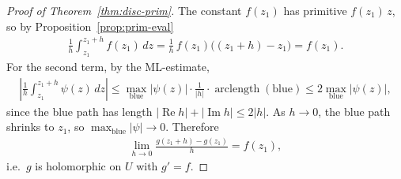 \documentclass[11pt]{article}
\theoremstyle{plain}
\theoremstyle{definition}
\theoremstyle{remark}
\numberwithin{equation}{section}
\newcommand{\be}{\begin{eqnarray}}
\newcommand{\ee}{\end{eqnarray}}
\DeclareMathOperator{\Real}{Re}
\DeclareMathOperator{\Imag}{Im}
\begin{document}
\begin{proof}[Proof of Theorem~\ref{thm:disc-prim}]
The constant $f(z_1)$ has primitive $f(z_1)\,z$, so by
Proposition~\ref{prop:prim-eval}
\be
 \frac1h\int_{z_1}^{z_1+h}f(z_1)\,dz=\frac1h\,f(z_1)\bigl((z_1+h)-z_1\bigr)=f(z_1).
\ee
For the second term, by the ML-estimate,
\be
 \left|\frac1h\int_{z_1}^{z_1+h}\psi(z)\,dz\right|
 \leq\max_{\text{blue}}|\psi(z)|\cdot\frac1{|h|}\cdot\operatorname{arclength}(\text{blue})
 \leq2\max_{\text{blue}}|\psi(z)|,
\ee
since the blue path has length $|\Real h|+|\Imag h|\leq2|h|$. As $h\to0$, the
blue path shrinks to $z_1$, so $\max_{\text{blue}}|\psi|\to0$. Therefore
\be
 \lim_{h\to0}\frac{g(z_1+h)-g(z_1)}{h}=f(z_1),
\ee
i.e.\ $g$ is holomorphic on $U$ with $g'=f$.
\end{proof}
\end{document}

